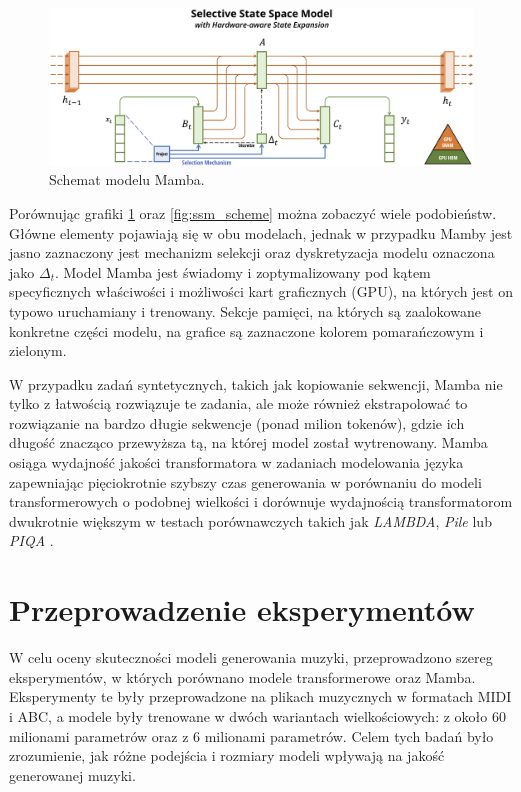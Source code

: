 \documentclass[data-science]{agh-wi} %
\begin{document}
\begin{figure}[ht!]
    \begin{center}
        \includegraphics[width=0.9\linewidth]{img/mamba1.png}
    \end{center}
    \caption{Schemat modelu Mamba.}
    \label{fig:mamba1}
\end{figure}

Porównując grafiki \ref*{fig:mamba1} oraz \ref*{fig:ssm_scheme} można zobaczyć wiele podobieństw. Główne elementy pojawiają się w obu modelach, jednak w przypadku Mamby jest jasno zaznaczony jest mechanizm selekcji oraz dyskretyzacja modelu oznaczona jako $\Delta_t$. Model Mamba jest świadomy i zoptymalizowany pod kątem specyficznych właściwości i możliwości kart graficznych (GPU), na których jest on typowo uruchamiany i trenowany. Sekcje pamięci, na których są zaalokowane konkretne części modelu, na grafice są zaznaczone kolorem pomarańczowym i zielonym.

W przypadku zadań syntetycznych, takich jak kopiowanie sekwencji, Mamba nie tylko z łatwością rozwiązuje te zadania, ale może również ekstrapolować to rozwiązanie na bardzo długie sekwencje (ponad milion tokenów), gdzie ich długość znacząco przewyższa tą, na której model został wytrenowany. Mamba osiąga wydajność jakości transformatora w zadaniach modelowania języka zapewniając pięciokrotnie szybszy czas generowania w porównaniu do modeli transformerowych o podobnej wielkości i dorównuje wydajnością transformatorom dwukrotnie większym w testach porównawczych takich jak \textit{LAMBDA}, \textit{Pile} lub \textit{PIQA} \cite{mamba}.

\chapter{Przeprowadzenie eksperymentów}
W celu oceny skuteczności modeli generowania muzyki, przeprowadzono szereg eksperymentów, w których porównano modele transformerowe oraz Mamba. Eksperymenty te były przeprowadzone na plikach muzycznych w formatach MIDI i ABC, a modele były trenowane w dwóch wariantach wielkościowych: z około 60 milionami parametrów oraz z 6 milionami parametrów. Celem tych badań było zrozumienie, jak różne podejścia i rozmiary modeli wpływają na jakość generowanej muzyki.
\end{document}

